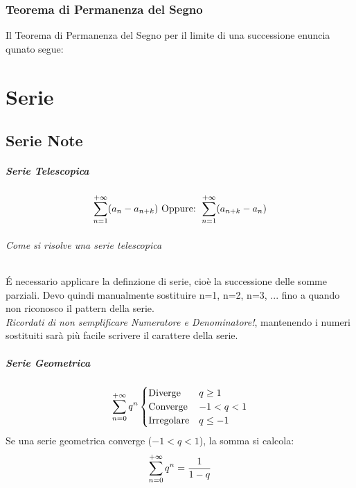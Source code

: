 \documentclass[12pt, a4paper, openany]{book}
\begin{document}
\subsection{Teorema di Permanenza del Segno}
Il Teorema di Permanenza del Segno per il limite di una successione enuncia qunato segue:


\chapter{Serie}
\section{Serie Note}

\paragraph*{Serie Telescopica}
\begin{equation*}
	\sum_{n=1}^{+\infty} (a_n - a_{n+k})
	\text{ Oppure: }
	\sum_{n=1}^{+\infty} (a_{n+k} - a_n)
\end{equation*}

\subparagraph{Come si risolve una serie telescopica}
É necessario applicare la definzione di serie, cioè la successione delle somme
parziali. Devo quindi manualmente sostituire n=1, n=2, n=3, ...
fino a quando non riconosco il pattern della serie.
\\ \emph{Ricordati di non semplificare Numeratore e Denominatore!},
mantenendo i numeri sostituiti sarà più facile scrivere il carattere della serie.


\paragraph*{Serie Geometrica}
\begin{equation*}
	\sum_{n=0}^{+\infty} q^n \begin{cases}
		\text{Diverge}    & q\geq 1  \\
		\text{Converge}   & -1<q<1   \\
		\text{Irregolare} & q\leq -1
	\end{cases}
\end{equation*}
 Se una serie geometrica converge ($-1<q<1$),
la somma si calcola:
\[
	\sum_{n=0}^{+\infty} q^n = \frac{1}{1-q}
\]
\end{document}
